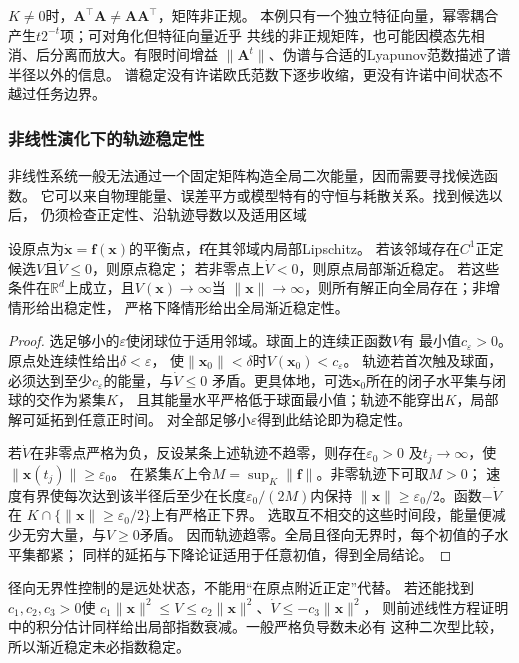 $K\neq0$时，$\bm A^\top\bm A\neq\bm A\bm A^\top$，矩阵非正规。
本例只有一个独立特征向量，幂零耦合产生$t2^{-t}$项；可对角化但特征向量近乎
共线的非正规矩阵，也可能因模态先相消、后分离而放大。有限时间增益
$\|\bm A^t\|$、伪谱与合适的Lyapunov范数描述了谱半径以外的信息。
谱稳定没有许诺欧氏范数下逐步收缩，更没有许诺中间状态不越过任务边界。

\subsubsection{非线性演化下的轨迹稳定性}
\label{sec:action-state-nonlinear-stability}
非线性系统一般无法通过一个固定矩阵构造全局二次能量，因而需要寻找候选函数。
它可以来自物理能量、误差平方或模型特有的守恒与耗散关系。找到候选以后，
仍须检查正定性、沿轨迹导数以及适用区域
\begin{theorem}[连续时间Lyapunov判据]
  \label{thm:dynamical-nonlinear-lyapunov}
  设原点为$\dot{\bm x}=\bm f(\bm x)$的平衡点，$\bm f$在其邻域内局部Lipschitz。
  若该邻域存在$C^1$正定候选$V$且$\dot V\leq0$，则原点稳定；
  若非零点上$\dot V<0$，则原点局部渐近稳定。
  若这些条件在$\mathbb R^d$上成立，且$V(\bm x)\to\infty$当
  $\|\bm x\|\to\infty$，则所有解正向全局存在；非增情形给出稳定性，
  严格下降情形给出全局渐近稳定性。
\end{theorem}
\begin{proof}
  选足够小的$\varepsilon$使闭球位于适用邻域。球面上的连续正函数$V$有
  最小值$c_\varepsilon>0$。原点处连续性给出$\delta<\varepsilon$，
  使$\|\bm x_0\|<\delta$时$V(\bm x_0)<c_\varepsilon$。
  轨迹若首次触及球面，必须达到至少$c_\varepsilon$的能量，与$\dot V\leq0$
  矛盾。更具体地，可选$\bm x_0$所在的闭子水平集与闭球的交作为紧集$K$，
  且其能量水平严格低于球面最小值；轨迹不能穿出$K$，局部解可延拓到任意正时间。
  对全部足够小$\varepsilon$得到此结论即为稳定性。

  若$\dot V$在非零点严格为负，反设某条上述轨迹不趋零，则存在$\varepsilon_0>0$
  及$t_j\to\infty$，使$\|\bm x(t_j)\|\geq\varepsilon_0$。
  在紧集$K$上令$M=\sup_K\|\bm f\|$。非零轨迹下可取$M>0$；
  速度有界使每次达到该半径后至少在长度$\varepsilon_0/(2M)$内保持
  $\|\bm x\|\geq\varepsilon_0/2$。函数$-\dot V$在
  $K\cap\{\|\bm x\|\geq\varepsilon_0/2\}$上有严格正下界。
  选取互不相交的这些时间段，能量便减少无穷大量，与$V\geq0$矛盾。
  因而轨迹趋零。全局且径向无界时，每个初值的子水平集都紧；
  同样的延拓与下降论证适用于任意初值，得到全局结论。
\end{proof}
径向无界性控制的是远处状态，不能用“在原点附近正定”代替。
若还能找到$c_1,c_2,c_3>0$使
$c_1\|\bm x\|^2\leq V\leq c_2\|\bm x\|^2$、$\dot V\leq-c_3\|\bm x\|^2$，
则前述线性方程证明中的积分估计同样给出局部指数衰减。一般严格负导数未必有
这种二次型比较，所以渐近稳定未必指数稳定。

